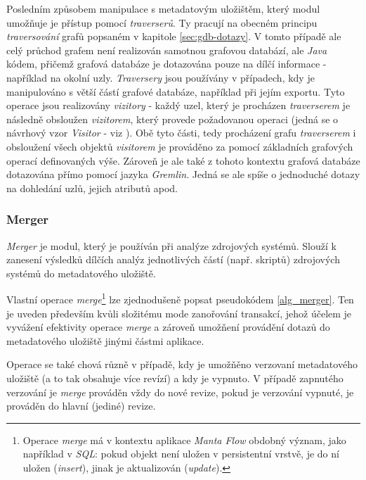 Posledním způsobem manipulace s metadatovým uložištěm, který modul umožňuje je přístup pomocí \textit{traverserů}. Ty pracují na obecném principu \textit{traversování} grafů popsaném v kapitole \ref{sec:gdb-dotazy}. V tomto případě ale celý průchod grafem není realizován samotnou grafovou databází, ale \textit{Java} kódem, přičemž grafová databáze je dotazována pouze na dílčí informace - například na okolní uzly. \textit{Traversery} jsou používány v případech, kdy je manipulováno s větší částí grafové databáze, například při jejím exportu. Tyto operace jsou realizovány \textit{vizitory} - každý uzel, který je procházen \textit{traverserem} je následně obsloužen \textit{vizitorem}, který provede požadovanou operaci (jedná se o návrhový vzor \textit{Visitor} - viz \cite{Gamma94}). Obě tyto části, tedy procházení grafu \textit{traverserem} i obsloužení všech objektů \textit{visitorem} je prováděno za pomocí základních grafových operací definovaných výše. Zároveň je ale také z tohoto kontextu grafová databáze dotazována přímo pomocí jazyka \textit{Gremlin}. Jedná se ale spíše o jednoduché dotazy na dohledání uzlů, jejich atributů apod. 

\subsubsection{Merger}
\textit{Merger} je modul, který je používán při analýze zdrojových systémů. Slouží k zanesení výsledků dílčích analýz jednotlivých částí (např. skriptů) zdrojových systémů do metadatového uložiště. 


Vlastní operace \textit{merge}\footnote{Operace \textit{merge} má v kontextu aplikace \textit{Manta Flow} obdobný význam, jako například v \textit{SQL}: pokud objekt není uložen v persistentní vrstvě, je do ní uložen (\textit{insert}), jinak je aktualizován (\textit{update}).} lze zjednodušeně popsat pseudokódem \ref{alg_merger}. Ten je uveden především kvůli složitému mode zanořování transakcí, jehož účelem je vyvážení efektivity operace \textit{merge} a zároveň umožňení provádění dotazů do metadatového uložiště jinými částmi aplikace. %

Operace se také chová různě v případě, kdy je umožňěno verzovaní metadatového uložiště (a to tak obsahuje více revízí) a kdy je vypnuto. V případě zapnutého verzování je \textit{merge} prováděn vždy do nové revize, pokud je verzování vypnuté, je prováděn do hlavní (jediné) revize. 

